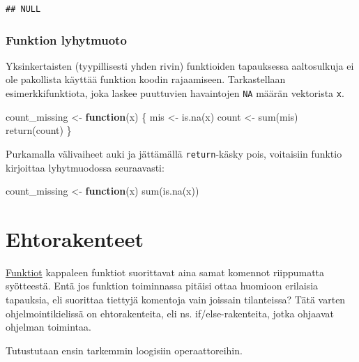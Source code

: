 \documentclass[
]{book}
\newenvironment{Shaded}{\begin{snugshade}}{\end{snugshade}}
\newcommand{\ControlFlowTok}[1]{\textcolor[rgb]{0.13,0.29,0.53}{\textbf{#1}}}
\newcommand{\FunctionTok}[1]{\textcolor[rgb]{0.00,0.00,0.00}{#1}}
\newcommand{\NormalTok}[1]{#1}
\newcommand{\OtherTok}[1]{\textcolor[rgb]{0.56,0.35,0.01}{#1}}
\begin{document}
\begin{verbatim}
## NULL
\end{verbatim}

\hypertarget{funktion-lyhytmuoto}{%
\subsection{Funktion lyhytmuoto}\label{funktion-lyhytmuoto}}

Yksinkertaisten (tyypillisesti yhden rivin) funktioiden tapauksessa aaltosulkuja ei ole pakollista käyttää funktion koodin rajaamiseen. Tarkastellaan esimerkkifunktiota, joka laskee puuttuvien havaintojen \texttt{NA} määrän vektorista \texttt{x}.

\begin{Shaded}
\begin{Highlighting}[]
\NormalTok{count\_missing }\OtherTok{\textless{}{-}} \ControlFlowTok{function}\NormalTok{(x) \{}
\NormalTok{  mis }\OtherTok{\textless{}{-}} \FunctionTok{is.na}\NormalTok{(x)}
\NormalTok{  count }\OtherTok{\textless{}{-}} \FunctionTok{sum}\NormalTok{(mis)}
  \FunctionTok{return}\NormalTok{(count)}
\NormalTok{\}}
\end{Highlighting}
\end{Shaded}

Purkamalla välivaiheet auki ja jättämällä \texttt{return}-käsky pois, voitaisiin funktio kirjoittaa lyhytmuodossa seuraavasti:

\begin{Shaded}
\begin{Highlighting}[]
\NormalTok{count\_missing }\OtherTok{\textless{}{-}} \ControlFlowTok{function}\NormalTok{(x) }\FunctionTok{sum}\NormalTok{(}\FunctionTok{is.na}\NormalTok{(x))}
\end{Highlighting}
\end{Shaded}

\hypertarget{ifelse}{%
\chapter{Ehtorakenteet}\label{ifelse}}

\protect\hyperlink{functions}{Funktiot} kappaleen funktiot suorittavat aina samat komennot riippumatta syötteestä. Entä jos funktion toiminnassa pitäisi ottaa huomioon erilaisia tapauksia, eli suorittaa tiettyjä komentoja vain joissain tilanteissa? Tätä varten ohjelmointikielissä on ehtorakenteita, eli ns. if/else-rakenteita, jotka ohjaavat ohjelman toimintaa.

Tutustutaan ensin tarkemmin loogisiin operaattoreihin.
\end{document}
